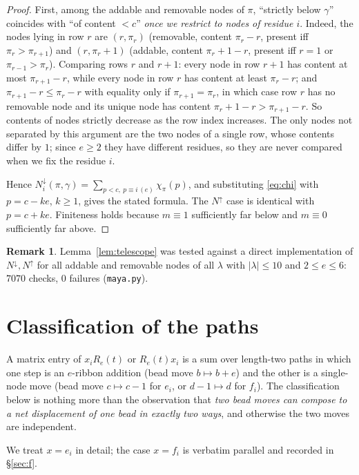 \documentclass[11pt]{article}
\theoremstyle{plain}
\theoremstyle{definition}
\newtheorem{remark}[theorem]{Remark}
\newcommand{\Nb}{N^{\downarrow}}
\newcommand{\Na}{N^{\uparrow}}
\begin{document}
\begin{proof}
First, among the addable and removable nodes of $\pi$, ``strictly below $\gamma$''
coincides with ``of content $<c$'' \emph{once we restrict to nodes of residue $i$}.
Indeed, the nodes lying in row $r$ are $(r,\pi_r)$ (removable, content $\pi_r-r$,
present iff $\pi_r>\pi_{r+1}$) and $(r,\pi_r+1)$ (addable, content $\pi_r+1-r$,
present iff $r=1$ or $\pi_{r-1}>\pi_r$). Comparing rows $r$ and $r+1$: every node in
row $r+1$ has content at most $\pi_{r+1}-r$, while every node in row $r$ has content
at least $\pi_r-r$; and $\pi_{r+1}-r\le\pi_r-r$ with equality only if
$\pi_{r+1}=\pi_r$, in which case row $r$ has no removable node and its unique node
has content $\pi_r+1-r>\pi_{r+1}-r$. So contents of nodes strictly decrease as the
row index increases. The only nodes not separated by this argument are the two nodes
of a single row, whose contents differ by $1$; since $e\ge2$ they have different
residues, so they are never compared when we fix the residue $i$.

Hence $\Nb_i(\pi,\gamma)=\sum_{p<c,\ p\equiv i\,(e)}\chi_\pi(p)$, and substituting
\eqref{eq:chi} with $p=c-ke$, $k\ge1$, gives the stated formula. The
$\Na$ case is identical with $p=c+ke$. Finiteness holds because $m\equiv1$
sufficiently far below and $m\equiv0$ sufficiently far above.
\end{proof}

\begin{remark}
Lemma~\ref{lem:telescope} was tested against a direct implementation of
$\Nb,\Na$ for all addable and removable nodes of all $\lambda$ with $|\lambda|\le10$
and $2\le e\le 6$: $7070$ checks, $0$ failures (\texttt{maya.py}).
\end{remark}

\section{Classification of the paths}

A matrix entry of $x_iR_e(t)$ or $R_e(t)x_i$ is a sum over length-two paths in
which one step is an $e$-ribbon addition (bead move $b\mapsto b+e$) and the other is
a single-node move (bead move $c\mapsto c-1$ for $e_i$, or $d-1\mapsto d$ for
$f_i$). The classification below is nothing more than the observation that
\emph{two bead moves can compose to a net displacement of one bead in exactly two
ways}, and otherwise the two moves are independent.

We treat $x=e_i$ in detail; the case $x=f_i$ is verbatim parallel and recorded in
\S\ref{sec:f}.
\end{document}
